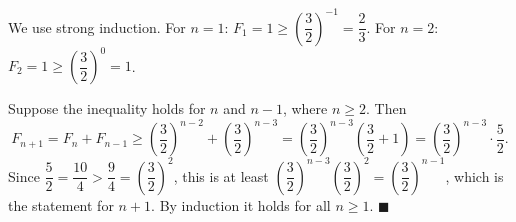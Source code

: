 We use strong induction. For $n=1$: $F_1=1\ge\left(\dfrac{3}{2}\right)^{-1}=\dfrac{2}{3}$. For $n=2$: $F_2=1\ge\left(\dfrac{3}{2}\right)^0=1$.

Suppose the inequality holds for $n$ and $n-1$, where $n\ge2$. Then
\[
F_{n+1}=F_n+F_{n-1}\ge\left(\dfrac{3}{2}\right)^{n-2}+\left(\dfrac{3}{2}\right)^{n-3}=\left(\dfrac{3}{2}\right)^{n-3}\left(\dfrac{3}{2}+1\right)=\left(\dfrac{3}{2}\right)^{n-3}\cdot\dfrac{5}{2} .
\]
Since $\dfrac{5}{2}=\dfrac{10}{4}>\dfrac{9}{4}=\left(\dfrac{3}{2}\right)^2$, this is at least $\left(\dfrac{3}{2}\right)^{n-3}\left(\dfrac{3}{2}\right)^2=\left(\dfrac{3}{2}\right)^{n-1}$, which is the statement for $n+1$. By induction it holds for all $n\ge1$. $\blacksquare$
